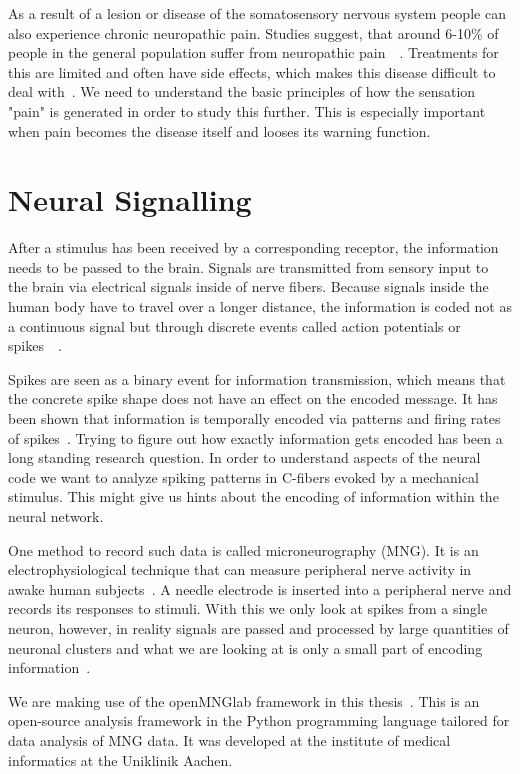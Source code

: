 As a result of a lesion or disease of the somatosensory nervous system people can also experience chronic neuropathic pain. Studies suggest, that around 6-10\% of people in the general population suffer from neuropathic pain~\cite{bouhassira_prevalence_2008}~\cite{van_hecke_neuropathic_2014}. Treatments for this are limited and often have side effects, which makes this disease difficult to deal with~\cite{brooks2017treatments}. We need to understand the basic principles of how the sensation "pain" is generated in order to study this further. This is especially important when pain becomes the disease itself and looses its warning function.

\section{Neural Signalling}
After a stimulus has been received by a corresponding receptor, the information needs to be passed to the brain.
Signals are transmitted from sensory input to the brain via electrical signals inside of nerve fibers. Because signals inside the human body have to travel over a longer distance, the information is coded not as a continuous signal but through discrete events called action potentials or spikes~\cite{rieke1999spikes}~\cite{spikeGeneral}.

Spikes are seen as a binary event for information transmission, which means that the concrete spike shape does not have an effect on the encoded message. It has been shown that information is temporally encoded via patterns and firing rates of spikes~\cite{spikeGeneral}. Trying to figure out how exactly information gets encoded has been a long standing research question.
In order to understand aspects of the neural code we want to analyze spiking patterns in C-fibers evoked by a mechanical stimulus. This might give us hints about the encoding of information within the neural network. 

One method to record such data is called microneurography (MNG). It is an electrophysiological technique that can measure peripheral nerve activity in awake human subjects~\cite{namer2009translational}. A needle electrode is inserted into a peripheral nerve and records its responses to stimuli. With this we only look at spikes from a single neuron, however, in reality signals are passed and processed by large quantities of neuronal clusters and what we are looking at is only a small part of encoding information~\cite{spikeGeneral}.

We are making use of the openMNGlab framework in this thesis~\cite{schlebusch_openmnglab_2021}. This is an open-source analysis framework in the Python programming language tailored for data analysis of MNG data. It was developed at the institute of medical informatics at the Uniklinik Aachen.

